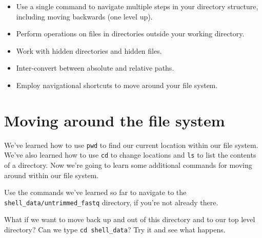 \documentclass[
  letterpaper,
  DIV=11,
  numbers=noendperiod]{scrreprt}
\newenvironment{Shaded}{\begin{snugshade}}{\end{snugshade}}
\newcommand{\ExtensionTok}[1]{\textcolor[rgb]{0.00,0.23,0.31}{#1}}
\newcommand{\NormalTok}[1]{\textcolor[rgb]{0.00,0.23,0.31}{#1}}
\providecommand{\tightlist}{%
  \setlength{\itemsep}{0pt}\setlength{\parskip}{0pt}}\usepackage{longtable,booktabs,array}
\begin{document}
\begin{tcolorbox}[enhanced jigsaw, opacitybacktitle=0.6, colback=white, coltitle=black, opacityback=0, rightrule=.15mm, toptitle=1mm, toprule=.15mm, bottomtitle=1mm, colframe=quarto-callout-important-color-frame, arc=.35mm, titlerule=0mm, colbacktitle=quarto-callout-important-color!10!white, leftrule=.75mm, title={🎯 Objectives}, breakable, bottomrule=.15mm, left=2mm]

\begin{itemize}
\tightlist
\item
  Use a single command to navigate multiple steps in your directory
  structure, including moving backwards (one level up).
\item
  Perform operations on files in directories outside your working
  directory.
\item
  Work with hidden directories and hidden files.
\item
  Inter-convert between absolute and relative paths.
\item
  Employ navigational shortcuts to move around your file system.
\end{itemize}

\end{tcolorbox}

\section{Moving around the file
system}\label{moving-around-the-file-system}

We've learned how to use \texttt{pwd} to find our current location
within our file system. We've also learned how to use \texttt{cd} to
change locations and \texttt{ls} to list the contents of a directory.
Now we're going to learn some additional commands for moving around
within our file system.

Use the commands we've learned so far to navigate to the
\texttt{shell\_data/untrimmed\_fastq} directory, if you're not already
there.

\begin{Shaded}
\end{Shaded}

What if we want to move back up and out of this directory and to our top
level directory? Can we type \texttt{cd\ shell\_data}? Try it and see
what happens.
\end{document}
